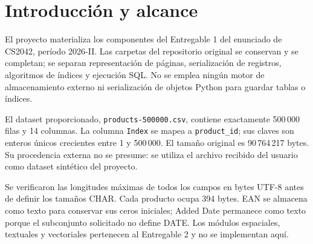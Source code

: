 \section{Introducción y alcance}
El proyecto materializa los componentes del Entregable 1 del enunciado de CS2042, período 2026-II. Las carpetas del repositorio original se conservan y se completan; se separan representación de páginas, serialización de registros, algoritmos de índices y ejecución SQL. No se emplea ningún motor de almacenamiento externo ni serialización de objetos Python para guardar tablas o índices.

El dataset proporcionado, \texttt{products-500000.csv}, contiene exactamente 500\,000 filas y 14 columnas. La columna \texttt{Index} se mapea a \texttt{product\_id}; sus claves son enteros únicos crecientes entre 1 y 500\,000. El tamaño original es 90\,764\,217 bytes. Su procedencia externa no se presume: se utiliza el archivo recibido del usuario como dataset sintético del proyecto.

Se verificaron las longitudes máximas de todos los campos en bytes UTF-8 antes de definir los tamaños CHAR. Cada producto ocupa 394 bytes. EAN se almacena como texto para conservar sus ceros iniciales; Added Date permanece como texto porque el subconjunto solicitado no define DATE. Los módulos espaciales, textuales y vectoriales pertenecen al Entregable 2 y no se implementan aquí.
